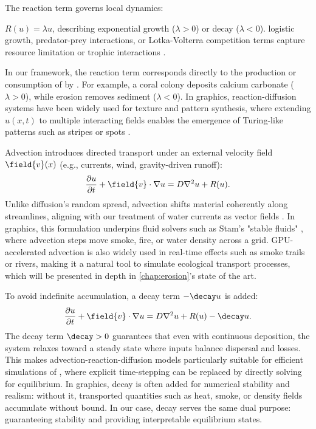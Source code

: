 The reaction term governs local dynamics:
\begin{Itemize}
     $R(u) = \lambda u$, describing exponential growth ($\lambda > 0$) or decay ($\lambda < 0$).
     logistic growth, predator-prey interactions, or Lotka-Volterra competition terms capture resource limitation or trophic interactions \cite{Brauer2012,Verhulst1844}.
\end{Itemize}
In our framework, the reaction term corresponds directly to the production or consumption of  by . For example, a coral colony deposits calcium carbonate ($\lambda > 0$), while erosion removes sediment ($\lambda < 0$).  
In graphics, reaction-diffusion systems have been widely used for texture and pattern synthesis, where extending $u(x,t)$ to multiple interacting fields enables the emergence of Turing-like patterns such as stripes or spots \cite{Turk1991, Witkin1991,Sanderson2006}.

Advection introduces directed transport under an external velocity field $\field{v}(x)$ (e.g., currents, wind, gravity-driven runoff):
\begin{align}
    \label{eq:reaction-diffusion-advection}
    \frac{\partial u}{\partial t} + \field{v}\cdot \nabla u = D \nabla^2 u + R(u).
\end{align}
Unlike diffusion's random spread, advection shifts material coherently along streamlines, aligning with our treatment of water currents as vector fields \cite{Burger2020,Ogden2017}.  
In graphics, this formulation underpins fluid solvers such as Stam's "stable fluids" \cite{Stam1999}, where advection steps move smoke, fire, or water density across a grid. GPU-accelerated advection is also widely used in real-time effects such as smoke trails or rivers, making it a natural tool to simulate ecological transport processes, which will be presented in depth in \cref{chap:erosion}'s state of the art.

To avoid indefinite accumulation, a decay term $-\decay u$ is added:
\begin{align}
    \label{eq:reaction-diffusion-advection-decay}
    \frac{\partial u}{\partial t} + \field{v}\cdot \nabla u = D \nabla^2 u + R(u) - \decay u.
\end{align}
The decay term $\decay > 0$ guarantees that even with continuous deposition, the system relaxes toward a steady state where inputs balance dispersal and losses. This makes advection-reaction-diffusion models particularly suitable for efficient simulations of , where explicit time-stepping can be replaced by directly solving for equilibrium.  
In graphics, decay is often added for numerical stability and realism: without it, transported quantities such as heat, smoke, or density fields accumulate without bound. In our case, decay serves the same dual purpose: guaranteeing stability and providing interpretable equilibrium states.

